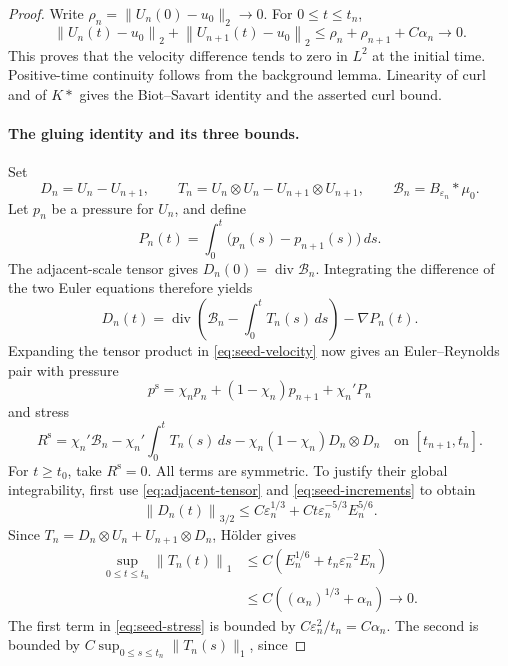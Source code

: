 \documentclass[11pt,a4paper,reqno]{amsart}
\theoremstyle{plain}
\theoremstyle{definition}
\theoremstyle{remark}
\numberwithin{equation}{section}
\newcommand{\Div}{\operatorname{div}}
\newcommand{\norm}[2]{\left\|#1\right\|_{#2}}
\begin{document}
\begin{proof}
Write $\rho_n=\|U_n(0)-u_0\|_2\to0$. For $0\le t\le t_n$,
\begin{equation}\label{eq:seed-trace-bound}
 \norm{U_n(t)-u_0}2+\norm{U_{n+1}(t)-u_0}2
 \le\rho_n+\rho_{n+1}+C\alpha_n\longrightarrow0.
\end{equation}
This proves that the velocity difference tends to zero in $L^2$ at
the initial time. Positive-time continuity follows
from the background lemma. Linearity of curl and of $K*$ gives the
Biot--Savart identity and the asserted curl bound.

\paragraph{The gluing identity and its three bounds.}
Set
\[
 D_n=U_n-U_{n+1},\qquad
 T_n=U_n\otimes U_n-U_{n+1}\otimes U_{n+1},\qquad
 \mathcal B_n=B_{\varepsilon_n}*\mu_0.
\]
Let $p_n$ be a pressure for $U_n$, and define
\[
 P_n(t)=\int_0^t\bigl(p_n(s)-p_{n+1}(s)\bigr)\,ds.
\]
The adjacent-scale tensor gives $D_n(0)=\Div\mathcal B_n$.
Integrating the difference of the two Euler equations therefore yields
\[
 D_n(t)=\Div\left(\mathcal B_n-\int_0^tT_n(s)\,ds\right)
                         -\nabla P_n(t).
\]
Expanding the tensor product in \eqref{eq:seed-velocity} now gives
an Euler--Reynolds pair with pressure
\[
 p^{\mathrm s}=\chi_n p_n+(1-\chi_n)p_{n+1}+\chi_n'P_n
\]
and stress
\begin{equation}\label{eq:seed-stress}
 R^{\mathrm s}
 =\chi_n'\mathcal B_n-\chi_n'\int_0^t T_n(s)\,ds
       -\chi_n(1-\chi_n)D_n\otimes D_n
 \quad\text{on }[t_{n+1},t_n].
\end{equation}
For $t\ge t_0$, take $R^{\mathrm s}=0$.
All terms are symmetric. To justify their global integrability, first
use \eqref{eq:adjacent-tensor} and \eqref{eq:seed-increments} to obtain
\[
 \norm{D_n(t)}{3/2}
 \le C\varepsilon_n^{1/3}
      +Ct\varepsilon_n^{-5/3}E_n^{5/6}.
\]
Since $T_n=D_n\otimes U_n+U_{n+1}\otimes D_n$, H\"older gives
\begin{equation}\label{eq:seed-cross}
 \begin{aligned}
 \sup_{0\le t\le t_n}\norm{T_n(t)}1
 &\le C\left(E_n^{1/6}+t_n\varepsilon_n^{-2}E_n\right)\\
 &\le C\left((\alpha_n)^{1/3}+\alpha_n\right)\longrightarrow0.
 \end{aligned}
\end{equation}
The first term in \eqref{eq:seed-stress} is bounded by
$C\varepsilon_n^2/t_n=C\alpha_n$. The second is bounded by
$C\sup_{0\le s\le t_n}\|T_n(s)\|_1$, since

\end{proof}
\end{document}
